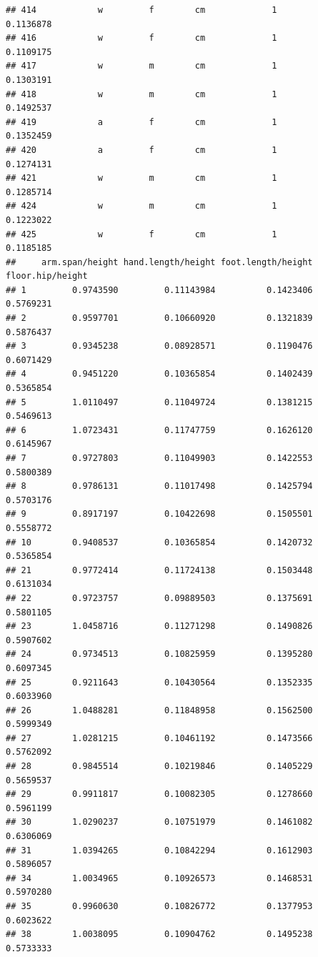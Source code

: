 \documentclass[]{article}
\begin{document}
\begin{verbatim}
## 414            w         f        cm             1          0.1136878
## 416            w         f        cm             1          0.1109175
## 417            w         m        cm             1          0.1303191
## 418            w         m        cm             1          0.1492537
## 419            a         f        cm             1          0.1352459
## 420            a         f        cm             1          0.1274131
## 421            w         m        cm             1          0.1285714
## 424            w         m        cm             1          0.1223022
## 425            w         f        cm             1          0.1185185
##     arm.span/height hand.length/height foot.length/height floor.hip/height
## 1         0.9743590         0.11143984          0.1423406        0.5769231
## 2         0.9597701         0.10660920          0.1321839        0.5876437
## 3         0.9345238         0.08928571          0.1190476        0.6071429
## 4         0.9451220         0.10365854          0.1402439        0.5365854
## 5         1.0110497         0.11049724          0.1381215        0.5469613
## 6         1.0723431         0.11747759          0.1626120        0.6145967
## 7         0.9727803         0.11049903          0.1422553        0.5800389
## 8         0.9786131         0.11017498          0.1425794        0.5703176
## 9         0.8917197         0.10422698          0.1505501        0.5558772
## 10        0.9408537         0.10365854          0.1420732        0.5365854
## 21        0.9772414         0.11724138          0.1503448        0.6131034
## 22        0.9723757         0.09889503          0.1375691        0.5801105
## 23        1.0458716         0.11271298          0.1490826        0.5907602
## 24        0.9734513         0.10825959          0.1395280        0.6097345
## 25        0.9211643         0.10430564          0.1352335        0.6033960
## 26        1.0488281         0.11848958          0.1562500        0.5999349
## 27        1.0281215         0.10461192          0.1473566        0.5762092
## 28        0.9845514         0.10219846          0.1405229        0.5659537
## 29        0.9911817         0.10082305          0.1278660        0.5961199
## 30        1.0290237         0.10751979          0.1461082        0.6306069
## 31        1.0394265         0.10842294          0.1612903        0.5896057
## 34        1.0034965         0.10926573          0.1468531        0.5970280
## 35        0.9960630         0.10826772          0.1377953        0.6023622
## 38        1.0038095         0.10904762          0.1495238        0.5733333

\end{verbatim}
\end{document}
